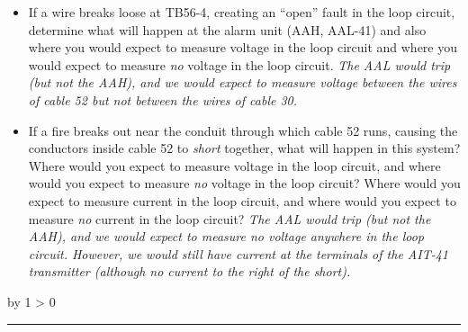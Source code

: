 \documentclass[12pt,a4paper]{article}
\def\notes{
           \advance\explnum by 1
           \ifnum \explnum > 0
                \hrule
                \vskip 3pt
                \leftline{Notes \the\explnum}
                \vskip 3pt \fi}
\begin{document}
\begin{itemize}
\item{} If a wire breaks loose at TB56-4, creating an ``open'' fault in the loop circuit, determine what will happen at the alarm unit (AAH, AAL-41) and also where you would expect to measure voltage in the loop circuit and where you would expect to measure {\it no} voltage in the loop circuit.  {\it The AAL would trip (but not the AAH), and we would expect to measure voltage between the wires of cable 52 but not between the wires of cable 30.}
\vskip 10pt
\item{} If a fire breaks out near the conduit through which cable 52 runs, causing the conductors inside cable 52 to {\it short} together, what will happen in this system?  Where would you expect to measure voltage in the loop circuit, and where would you expect to measure {\it no} voltage in the loop circuit?  Where would you expect to measure current in the loop circuit, and where would you expect to measure {\it no} current in the loop circuit?  {\it The AAL would trip (but not the AAH), and we would expect to measure no voltage anywhere in the loop circuit.  However, we would still have current at the terminals of the AIT-41 transmitter (although no current to the right of the short).}
\end{itemize}

\vskip 10pt \filbreak 





\notes{} 
\end{document}
